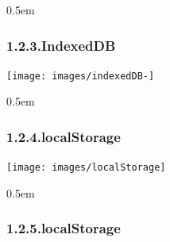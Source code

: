 \documentclass{article}
\begin{document}
\begin{mdbmargintb}{}{0.5em}%
\subsubsection{1.2.3.\hspace*{0.5em}IndexedDB}\label{sec-indexeddb}%
\end{mdbmargintb}%

\noindent{}%

\begin{mdcenter}%

\noindent{}\texttt{[image: images/indexedDB-]}{}%
\end{mdcenter}%

\begin{mdbmargintb}{}{0.5em}%
\subsubsection{1.2.4.\hspace*{0.5em}localStorage}\label{sec-localstorage}%
\end{mdbmargintb}%

\begin{mdcenter}%

\noindent{}\texttt{[image: images/localStorage]}{}%
\end{mdcenter}%

\noindent{}%

\begin{mdbmargintb}{}{0.5em}%
\subsubsection{1.2.5.\hspace*{0.5em}localStorage}\label{sec-localstorage}%
\end{mdbmargintb}%

\noindent{}%
\end{document}
